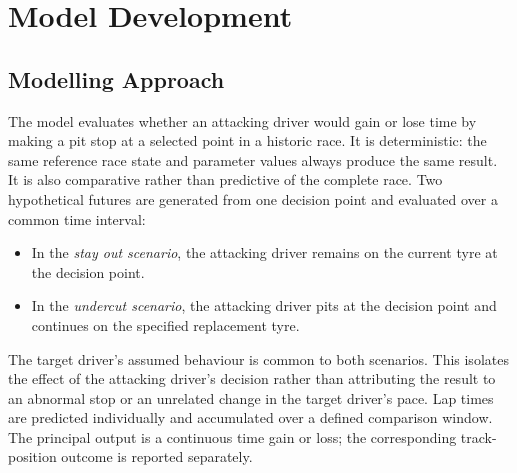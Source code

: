 \chapter{Model Development}
\label{chap:model}

%

\section{Modelling Approach}
\label{sec:modelling-approach}


The model evaluates whether an attacking driver would gain or lose time by
making a pit stop at a selected point in a historic race. It is deterministic:
the same reference race state and parameter values always produce the same
result. It is also comparative rather than predictive of the complete race.
Two hypothetical futures are generated from one decision point and evaluated
over a common time interval:

\begin{itemize}
    \item In the \emph{stay out scenario}, the attacking driver remains on the
    current tyre at the decision point.
    \item In the \emph{undercut scenario}, the attacking driver pits at the
    decision point and continues on the specified replacement tyre.
\end{itemize}

The target driver's assumed behaviour is common to both scenarios. This
isolates the effect of the attacking driver's decision rather than attributing
the result to an abnormal stop or an unrelated change in the target driver's
pace. Lap times are predicted individually and accumulated over a defined
comparison window. The principal output is a continuous time gain or loss; the
corresponding track-position outcome is reported separately.

